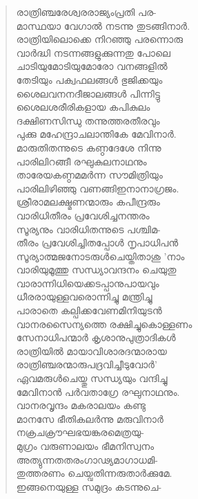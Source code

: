 \begin{verse}
രാത്രിഞ്ചരേശ്വരരാജ്യംപ്രതി പര-\\
മാസ്ഥയാ വേഗാല്‍ നടന്നു തുടങ്ങിനാര്‍.\\
രാത്രിയിലൊക്കെ നിറഞ്ഞു പരന്നൊരു\\
വാര്‍ദ്ധി നടന്നങ്ങളുക്കുന്നതു പോലെ\\
ചാടിയുമോടിയുമോരോ വനങ്ങളില്‍\\
തേടിയും പക്വഫലങ്ങള്‍ ഭുജിക്കയും\\
ശൈലവനനദീജാലങ്ങള്‍ പിന്നിട്ടു\\
ശൈലശരീരികളായ കപികുലം\\
ദക്ഷിണസിന്ധു തന്നുത്തരതീരവും\\
പുക്കു മഹേന്ദ്രാചലാന്തികേ മേവിനാര്‍.\\
മാരുതിതന്നുടെ കണ്ഠദേശേ നിന്നു\\
പാരിലിറങ്ങീ രഘുകുലനാഥനും\\
താരേയകണ്ഠമമര്‍ന്ന സൗമിത്രിയും\\
പാരിലിഴിഞ്ഞു വണങ്ങിഇനാനാഗ്രജം.\\
ശ്രീരാമലക്ഷ്മണന്മാരും കപീന്ദ്രരും\\
വാരിധിതീരം പ്രവേശിച്ചനന്തരം\\
സൂര്യനും വാരിധിതന്നുടെ പശ്ചിമ-\\
തീരം പ്രവേശിച്ചിതപ്പോള്‍ നൃപാധിപന്‍\\
സൂര്യാത്മജനോടരുള്‍ചെയ്തിതാശു ’നാം\\
വാരിയുമൂത്തു സന്ധ്യാവന്ദനം ചെയുതു\\
വാരാന്നിധിയെക്കടപ്പാനുപായവും\\
ധീരരായുള്ളവരൊന്നിച്ചു മന്ത്രിച്ചു\\
പാരാതെ കല്പിക്കവേണമിനിയുടന്‍\\
വാനരസൈന്യത്തെ രക്ഷിച്ചുകൊള്ളണം\\
സേനാധിപന്മാര്‍ കൃശാനുപുത്രാദികള്‍\\
രാത്രിയില്‍ മായാവിശാരദന്മാരായ\\
രാത്രിഞ്ചരന്മാരുപദ്രവിച്ചീടുവോര്‍’\\
ഏവമരുള്‍ചെയ്തു സന്ധ്യയും വന്ദിച്ചു\\
മേവിനാന്‍ പര്‍വതാഗ്രേ രഘുനാഥനും.\\
വാനരവൃന്ദം മകരാലയം കണ്ടു\\
മാനസേ ഭീതികലര്‍ന്നു മരുവിനാര്‍\\
നക്രചക്രൗഘഭയങ്കരമെത്രയു-\\
മുഗ്രം വരുണാലയം ഭീമനിസ്വനം\\
അത്യുന്നതതരംഗാഢ്യമാഗാധമി-\\
തുത്തരണം ചെയ്വതിന്നരുതാര്‍ക്കുമേ.\\
ഇങ്ങനെയുള്ള സമുദ്രം കടന്നുചെ-\\

\end{verse}
